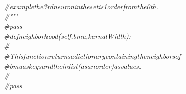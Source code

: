 {{\begin{tabbing}
$${\it{\#\hspace{42pt}example\hspace{6pt}the\hspace{6pt}3rd\hspace{6pt}neuron\hspace{6pt}in\hspace{6pt}the\hspace{6pt}set\hspace{6pt}is\hspace{6pt}1\hspace{6pt}order\hspace{6pt}from\hspace{6pt}the\hspace{6pt}0th.}}\\
{\it{\#\hspace{42pt}\string"\string"\string"}}\\
{\it{\#\hspace{42pt}pass}}\\
{\it{\#\hspace{24pt}def\hspace{6pt}neighborhood(self,bmu,kernalWidth):}}\\
{\it{\#}}\\
{\it{\#\hspace{42pt}This\hspace{6pt}function\hspace{6pt}returns\hspace{6pt}a\hspace{6pt}dictionary\hspace{6pt}containing\hspace{6pt}the\hspace{6pt}neighbors\hspace{6pt}of}}\\
{\it{\#\hspace{42pt}bmu\hspace{6pt}as\hspace{6pt}keys\hspace{6pt}and\hspace{6pt}their\hspace{6pt}dist\hspace{6pt}(as\hspace{6pt}an\hspace{6pt}order)\hspace{6pt}as\hspace{6pt}values.}}\\
{\it{\#}}\\
{\it{\#\hspace{42pt}pass}}
\end{tabbing}}}
